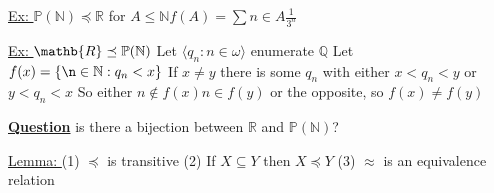 \documentclass{article}
\begin{document}
    \underline{Ex: } $\mathbb{P}(\mathbb{N}) \preceq \mathbb{R}$
    for $A \leq \mathbb{N} f(A) = \sum{n \in A} \frac{1}{3^n}$

    \underline{Ex: } $\mathb{R} \preceq \mathbb{P}(\mathbb{N})$
    Let $\langle q_n : n \in \omega \rangle$ enumerate $\mathbb{Q}$
    Let $f(x) = \set{\n \in \mathbb{N} : q_n < x}$
    If $x \neq y$ there is some $q_n$ with either $x < q_n < y$ or $y < q_n < x$
    So either $n \notin f(x) n \in f(y)$ or the opposite, so $f(x) \neq f(y)$

    \underline{\textbf{Question}} is there a bijection between $\mathbb{R}$ and $\mathbb{P}(\mathbb{N})$?

    \underline{Lemma: }
    (1) $\preceq$ is transitive
    (2) If $X \subseteq Y$ then $X \preceq Y$
    (3) $\approx$ is an equivalence relation

    
    
\end{document}
